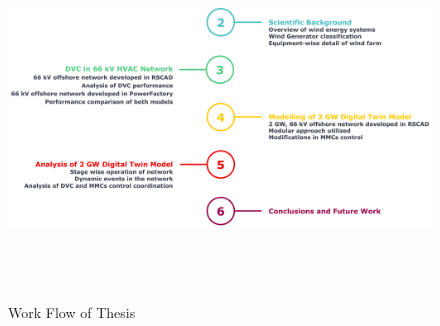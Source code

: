 \begin{figure}[H]
\centering
    \includegraphics[height = 9.5cm,width =\textwidth]{Diagrams/Chapter_1/Thesis_flowchart.pdf}
    \caption{Work Flow of Thesis}
    \label{fig:Thesis_outline}
\end{figure}
